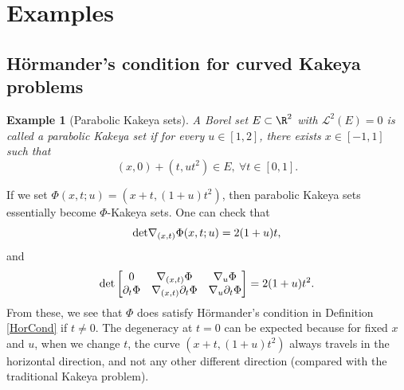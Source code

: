 \documentclass{article}
\numberwithin{equation}{section}
\theoremstyle{plain}
\newtheorem{example}[theorem]{Example}
\begin{document}







\section{Examples}



\subsection{
H\"ormander's condition for curved Kakeya problems
}


	
	\begin{example}[Parabolic Kakeya sets]\label{260626example2_1}
		A Borel set $E\subset \R^2$ with $\mathcal{L}^2(E)=0$ is called a parabolic Kakeya set if for every $u\in [1, 2]$, there exists $x\in [-1, 1]$ such that 
		\begin{equation}\label{le1.3}
			(x, 0)+ (t, u t^2)\in E, \ \forall t\in [0, 1].
		\end{equation}
	\end{example}
	
	 If we set $\Phi(x,t;u)= (x+t,(1+u)t^2)$, then parabolic Kakeya sets essentially become $\Phi$-Kakeya sets. One can check that 
	\begin{equation}
		{\rm det} \nabla_{(x, t)} \Phi(x, t; u)= 2(1+u)t,
	\end{equation}
	and 
	\begin{equation}
		{\rm det}	\begin{bmatrix}
			0 & \nabla_{(x, t)}\Phi & \nabla_{u}\Phi\\
			\partial_t \Phi & \nabla_{(x, t)}\partial_t \Phi & \nabla_{u}\partial_t\Phi
		\end{bmatrix}
	= 2(1+u)t^2.
	\end{equation}
From these, we see that $\Phi$ does satisfy H\"ormander's condition in Definition \ref{HorCond} if $t\neq 0$. The degeneracy at $t=0$ can be expected because for fixed $x$ and $u$, when we change $t$, the curve $(x+t,(1+u)t^2)$ always travels in the horizontal direction, and not any other different direction (compared with the traditional Kakeya problem).  
\end{document}
